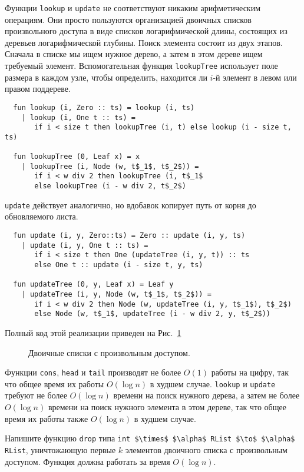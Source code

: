 Функции \lstinline!lookup! и \lstinline!update! не соответствуют
никаким арифметическим операциям. Они просто пользуются организацией
двоичных списков произвольного доступа в виде списков логарифмической
длины, состоящих из деревьев логарифмической глубины. Поиск элемента
состоит из двух этапов. Сначала в списке мы ищем нужное дерево, а
затем в этом дереве ищем требуемый элемент. Вспомогательная функция
\lstinline!lookupTree! использует поле размера в каждом узле, чтобы
определить, находится ли $i$-й элемент в левом или правом
поддереве.
\begin{lstlisting}
  fun lookup (i, Zero :: ts) = lookup (i, ts)
    | lookup (i, One t :: ts) =
       if i < size t then lookupTree (i, t) else lookup (i - size t, ts)

  fun lookupTree (0, Leaf x) = x
    | lookupTree (i, Node (w, t$_1$, t$_2$)) =
       if i < w div 2 then lookupTree (i, t$_1$
       else lookupTree (i - w div 2, t$_2$)
\end{lstlisting}
\lstinline!update! действует аналогично, но вдобавок копирует путь от
корня до обновляемого листа.
\begin{lstlisting}
  fun update (i, y, Zero::ts) = Zero :: update (i, y, ts)
    | update (i, y, One t :: ts) =
       if i < size t then One (updateTree (i, y, t)) :: ts
       else One t :: update (i - size t, y, ts)

  fun updateTree (0, y, Leaf x) = Leaf y
    | updateTree (i, y, Node (w, t$_1$, t$_2$)) =
       if i < w div 2 then Node (w, updateTree (i, y, t$_1$), t$_2$)
       else Node (w, t$_1$, updateTree (i - w div 2, y, t$_2$))
\end{lstlisting}
Полный код этой реализации приведен на Рис.~\ref{fig:9.6}

\begin{figure}
  \centering
  
  \caption{Двоичные списки с произвольным доступом.}
  \label{fig:9.6}
\end{figure}

Функции \lstinline!cons!, \lstinline!head! и \lstinline!tail!
производят не более $O(1)$ работы на цифру, так что общее время их
работы $O(\log n)$ в худшем случае. \lstinline!lookup! и
\lstinline!update! требуют не более $O(\log n)$ времени на поиск
нужного дерева, а затем не более $O(\log n)$ времени на поиск нужного
элемента в этом дереве, так что общее время их работы также $O(\log
n)$ в худшем случае.

\begin{exercise}\label{ex:9.1}
  Напишите функцию \lstinline!drop! типа 
  \lstinline!int $\times$ $\alpha$ RList $\to$ $\alpha$ RList!, уничтожающую первые $k$
  элементов двоичного списка с произвольным доступом. Функция должна
  работать за время $O(\log n)$.
\end{exercise}

